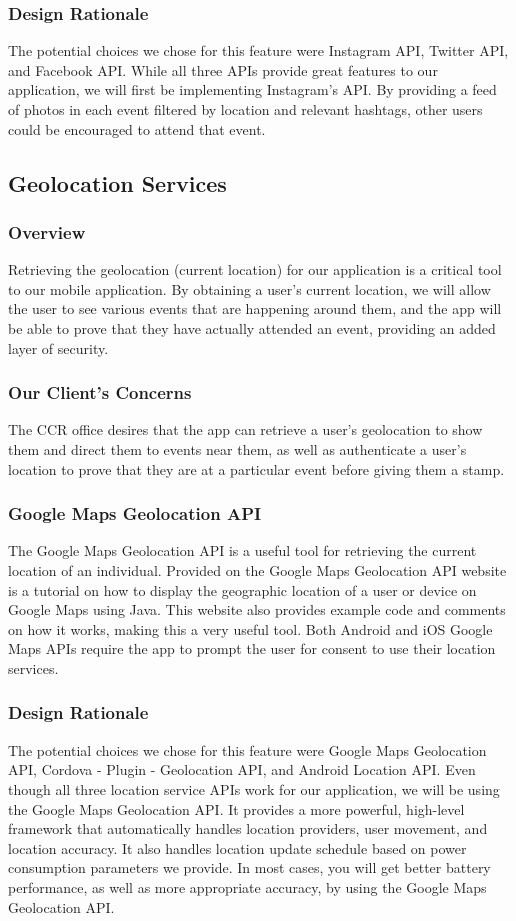\documentclass[draftclsnofoot, onecolumn, 10pt, compsoc]{IEEEtran}
\begin{document}
			\subsubsection{Design Rationale}
				The potential choices we chose for this feature were Instagram API, Twitter API, and Facebook API. While all three APIs provide great features to our application, we will first be implementing Instagram's API. By providing a feed of photos in each event filtered by location and relevant hashtags, other users could be encouraged to attend that event.

		\subsection{Geolocation Services}
			\subsubsection{Overview}
				Retrieving the geolocation (current location) for our application is a critical tool to our mobile application. By obtaining a user's current location, we will allow the user to see various events that are happening around them, and the app will be able to prove that they have actually attended an event, providing an added layer of security.
			\subsubsection{Our Client's Concerns}
				The CCR office desires that the app can retrieve a user's geolocation to show them and direct them to events near them, as well as authenticate a user's location to prove that they are at a particular event before giving them a stamp.
			\subsubsection{Google Maps Geolocation API}
				The Google Maps Geolocation API is a useful tool for retrieving the current location of an individual. Provided on the Google Maps Geolocation API website is a tutorial on how to display the geographic location of a user or device on Google Maps using Java. This website also provides example code and comments on how it works, making this a very useful tool. Both Android and iOS Google Maps APIs require the app to prompt the user for consent to use their location services.
				~\cite{GMaps}
			\subsubsection{Design Rationale}
				The potential choices we chose for this feature were Google Maps Geolocation API, Cordova - Plugin - Geolocation API, and Android Location API. Even though all three location service APIs work for our application, we will be using the Google Maps Geolocation API. It provides a more powerful, high-level framework that automatically handles location providers, user movement, and location accuracy. It also handles location update schedule based on power consumption parameters we provide. In most cases, you will get better battery performance, as well as more appropriate accuracy, by using the Google Maps Geolocation API.
				~\cite{GMaps}
\end{document}
